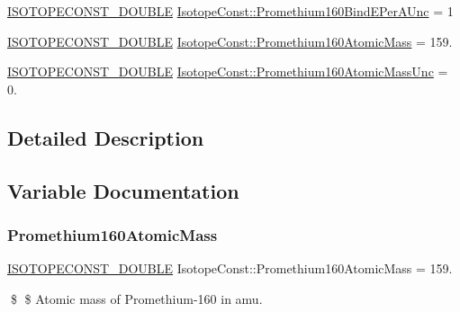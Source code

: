 \begin{DoxyCompactItemize}
\mbox{\hyperlink{group___isotope_const-_macros_ga8f45a7272ce02c0b4c65c44636ed719a}{I\+S\+O\+T\+O\+P\+E\+C\+O\+N\+S\+T\+\_\+\+D\+O\+U\+B\+LE}} \mbox{\hyperlink{group___isotope_const-_promethium-_pm160_ga74bd1267791257c1384c13648d06737b}{Isotope\+Const\+::\+Promethium160\+Bind\+E\+Per\+A\+Unc}} = 1
\item 
\mbox{\hyperlink{group___isotope_const-_macros_ga8f45a7272ce02c0b4c65c44636ed719a}{I\+S\+O\+T\+O\+P\+E\+C\+O\+N\+S\+T\+\_\+\+D\+O\+U\+B\+LE}} \mbox{\hyperlink{group___isotope_const-_promethium-_pm160_ga7ec415d330a5806940f98661416b81b4}{Isotope\+Const\+::\+Promethium160\+Atomic\+Mass}} = 159.
\item 
\mbox{\hyperlink{group___isotope_const-_macros_ga8f45a7272ce02c0b4c65c44636ed719a}{I\+S\+O\+T\+O\+P\+E\+C\+O\+N\+S\+T\+\_\+\+D\+O\+U\+B\+LE}} \mbox{\hyperlink{group___isotope_const-_promethium-_pm160_ga0effac8d2f66eee8731878beb88a8132}{Isotope\+Const\+::\+Promethium160\+Atomic\+Mass\+Unc}} = 0.
\end{DoxyCompactItemize}


\subsection{Detailed Description}


\subsection{Variable Documentation}
\mbox{\label{group___isotope_const-_promethium-_pm160_ga7ec415d330a5806940f98661416b81b4}} 
\subsubsection{\texorpdfstring{Promethium160\+Atomic\+Mass}{Promethium160AtomicMass}}
{\footnotesize\ttfamily \mbox{\hyperlink{group___isotope_const-_macros_ga8f45a7272ce02c0b4c65c44636ed719a}{I\+S\+O\+T\+O\+P\+E\+C\+O\+N\+S\+T\+\_\+\+D\+O\+U\+B\+LE}} Isotope\+Const\+::\+Promethium160\+Atomic\+Mass = 159.}

\$ \$ Atomic mass of Promethium-\/160 in amu. \mbox{\label{group___isotope_const-_promethium-_pm160_ga0effac8d2f66eee8731878beb88a8132}} 
